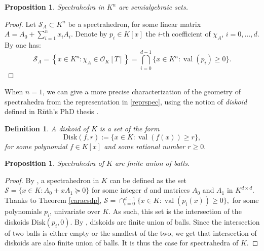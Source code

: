 \documentclass[sigconf]{acmart}
\newtheorem{proposition}[theorem]{Proposition}
\newtheorem{definition}[theorem]{Definition}
\DeclareMathOperator{\val}{val}
\newcommand{\OK}{\mathcal{O}_K}
\begin{document}
\begin{proposition}
  Spectrahedra in $K^n$ are semialgebraic sets. 
\end{proposition}
\begin{proof}
  Let $\mathcal{S}_A \subset K^n$ be a spectrahedron,
  for some linear matrix $A = A_0+\sum_{i=1}^n x_i A_i$. 
  Denote by $p_i \in K[x]$ the $i$-th coefficient of $\chi_{A}$, $i=0,\ldots,d$.
  By  one has:
  \begin{equation}\label{reprspec}
    \mathcal{S}_A
    = \left\{x \in K^n : \chi_{A} \in \OK[T]\right\}
  = \bigcap_{i=0}^{d-1} \{x \in K^n : \val(p_i) \geq 0\}.
  \end{equation}
\end{proof}


When $n=1$, we can give a more precise characterization of the geometry of spectrahedra
from the representation in \eqref{reprspec}, using the notion of \emph{diskoid} defined
in Rüth's PhD thesis \cite{ruth_models_2015}.

\begin{definition}
A diskoid of $K$ is a set of the form
\[  \mathrm{Disk}(f,r):= \{ x \in K : \val(f(x)) \geq r \},\]
for some polynomial $f \in K[x]$ and some rational number $r \geq 0.$
\end{definition}

\begin{proposition}
Spectrahedra of $K$ are finite union of balls. \label{prop_spectrahedra_dim1_are_diskoids}
\end{proposition}
\begin{proof}
By , a spectrahedron in $K$ 
can be defined as the set $\mathcal{S}=\{x \in K : A_0+x A_1 \succeq 0\}$
for some integer $d$ and matrices $A_0$ and $A_1$ in $K^{d \times d}$.
Thanks to Theorem \ref{caracsdp},
$\mathcal{S}=\cap_{i=0}^{d-1} \{x \in K : \val(p_i(x)) \geq 0\},$
for some polynomials $p_i$, univariate over $K$.
As such, this set is the intersection of the diskoids
$\mathrm{Disk}(p_i,0).$
By \cite[Lemma 6.9]{ABL_2021}, diskoids are finite union of balls.
Since the intersection of two balls is either empty
or the smallest of the two, we get that intersection of diskoids
are also finite union of balls.
It is thus the case for spectrahedra of $K$.
\end{proof}
\end{document}
